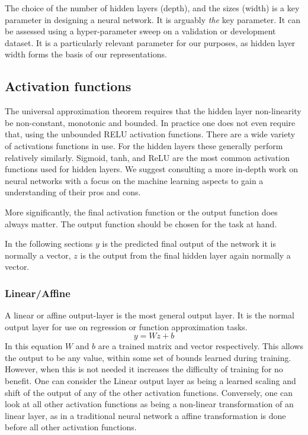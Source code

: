 \documentclass[12pt,parskip]{komatufte}
\begin{document}
The choice of the number of hidden layers (depth),
and the sizes (width) is a key parameter in designing a neural network.
It is arguably \emph{the} key parameter.
It can be assessed using a hyper-parameter sweep on a validation or development dataset.
It is a particularly relevant parameter for our purposes, as hidden layer width forms the basis of our representations.



\subsection{Activation functions}

The universal approximation theorem requires that the hidden layer non-linearity be non-constant, monotonic and bounded.
In practice one does not even require that, using the unbounded RELU activation functions.
There are a wide variety of activations functions in use.
For the hidden layers these generally perform relatively similarly.
Sigmoid, tanh, and ReLU are the most common activation functions used for hidden layers.
We suggest consulting a more in-depth work on neural networks with a focus on the machine learning aspects to gain a understanding of their pros and cons.

More significantly, the final activation function or the output function does always matter.
The output function should be chosen for the task at hand.

In the following sections $y$ is the predicted final output of the network it is normally a vector, $z$ is the output from the final hidden layer again normally a vector.

\subsubsection{Linear/Affine}
A linear or affine output-layer is the most general output layer.
It is the normal output layer for use on regression or function approximation tasks.
\begin{equation}
y=Wz + b
\end{equation}
In this equation $W$ and $b$ are a trained matrix and vector respectively.
This allows the output to be any value, within some set of bounds learned during training.
However, when this is not needed it increases the difficulty of training for no benefit.
One can consider the Linear output layer as being a learned scaling and shift of the output of any of the other activation functions.
Conversely, one can look at all other activation functions as being a non-linear transformation of an linear layer, as in a traditional neural network a affine transformation is done before all other activation functions.
\end{document}
